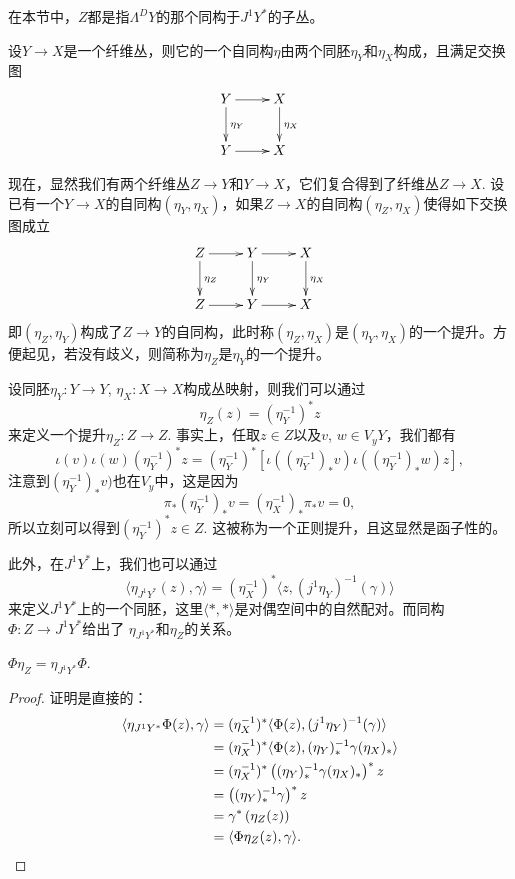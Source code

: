 在本节中，$Z$都是指$\Lambda^{D}Y$的那个同构于$J^1Y^*$的子丛。

\begin{para}[纤维丛的自同构]
设$Y\to X$是一个纤维丛，则它的一个自同构$\eta$由两个同胚$\eta_Y$和$\eta_X$构成，且满足交换图
\[
    \xymatrix{
        Y \ar[r] \ar[d]^{\eta_Y} &X\ar[d]^{\eta_X}\\
        Y \ar[r] &X
    }
\]
\end{para}

现在，显然我们有两个纤维丛$Z\to Y$和$Y\to X$，它们复合得到了纤维丛$Z\to X$. 
设已有一个$Y\to X$的自同构$(\eta_Y,\eta_X)$，如果$Z\to X$的自同构$(\eta_Z,\eta_X)$使得如下交换图成立
\[
    \xymatrix{
        Z \ar[r] \ar[d]^{\eta_Z} &Y\ar[r]\ar[d]^{\eta_Y}&X\ar[d]^{\eta_X}\\
        Z \ar[r] &Y\ar[r]&X
    }
\]
即$(\eta_Z,\eta_Y)$构成了$Z\to Y$的自同构，此时称$(\eta_Z,\eta_X)$是$(\eta_Y,\eta_X)$的一个提升。方便起见，若没有歧义，则简称为$\eta_Z$是$\eta_Y$的一个提升。

\begin{para}[正则提升]
    设同胚$\eta_Y:Y\to Y$, $\eta_X:X\to X$构成丛映射，则我们可以通过
    \[
        \eta_Z (z)=(\eta_Y^{-1})^*z
    \]
    来定义一个提升$\eta_Z :Z\to Z$. 事实上，任取$z\in Z$以及$v$, $w\in V_yY$，我们都有
    \[
        \iota(v)\iota(w)(\eta_Y^{-1})^*z=(\eta_Y^{-1})^*\left[\iota((\eta_Y^{-1})_*v)\iota((\eta_Y^{-1})_*w)z\right],
    \]
    注意到$(\eta_Y^{-1})_*v)$也在$V_y$中，这是因为
    \[
        \pi_*(\eta_Y^{-1})_*v=(\eta_X^{-1})_*\pi_*v=0,
    \]
    所以立刻可以得到$(\eta_Y^{-1})^*z\in Z$. 这被称为一个正则提升，且这显然是函子性的。
\end{para}

此外，在$J^1Y^*$上，我们也可以通过
\[
	\langle \eta_{J^1Y^*}(z),\gamma\rangle=(\eta_{X}^{-1})^*\langle z,(j^1\eta_Y)^{-1}(\gamma)\rangle
\]
来定义$J^1Y^*$上的一个同胚，这里$\langle *,*\rangle$是对偶空间中的自然配对。而同构$\Phi:Z\to J^1Y^*$给出了
$\eta_{J^1Y^*}$和$\eta_Z$的关系。

\begin{lem}
$\Phi\eta_Z=\eta_{J^1Y^*}\Phi$.
\end{lem}

\begin{proof}
证明是直接的：
\begin{align*}
	\langle \eta_{J^1Y^*}\Phi (z),\gamma\rangle&=(\eta_{X}^{-1})^*\langle \Phi(z),(j^1\eta_Y)^{-1}(\gamma)\rangle\\
	&=(\eta_{X}^{-1})^*\langle \Phi(z),(\eta_Y)_*^{-1}\gamma(\eta_X)_*\rangle\\
	&=(\eta_{X}^{-1})^*\left((\eta_Y)_*^{-1}\gamma(\eta_X)_*\right)^*z\\
	&=\left((\eta_Y)_*^{-1}\gamma\right)^*z\\
	&=\gamma^*\left(\eta_Z(z)\right)\\
	&=\langle \Phi\eta_Z(z),\gamma\rangle.\qedhere
\end{align*}
\end{proof}

